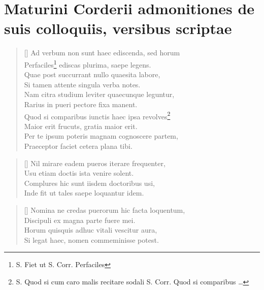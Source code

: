 \documentclass{article}
\begin{document}
\section*{Maturini Corderii admonitiones de suis colloquiis, versibus scriptae}


\settowidth{\versewidth}{Nam citra studium leviter quaecunque leguntur,}
\begin{verse}[\versewidth]
Ad verbum non sunt haec ediscenda, sed horum\\
Perfaciles\footnote{S. Fiet ut S. Corr. Perfaciles} ediscas plurima, saepe legens.\\
Quae post succurrant nullo quaesita labore,\\
Si tamen attente singula verba notes.\\
Nam citra studium leviter quaecunque leguntur,\\
Rarius in pueri pectore fixa manent.\\
Quod si comparibus iunctis haec ipsa revolves\footnote{S. Quod si cum caro malis recitare sodali S. Corr. Quod si comparibus \ldots}\\
Maior erit frucuts, gratia maior erit.\\
Per te ipsum poteris magnam cognoscere partem,\\
Praeceptor faciet cetera plana tibi.\\
\end{verse}


\settowidth{\versewidth}{Nil mirare eadem pueros iterare frequenter,}
\begin{verse}[\versewidth]
Nil mirare eadem pueros iterare frequenter,\\
Usu etiam doctis ista venire solent.\\
Complures hic sunt iisdem doctoribus usi,\\
Inde fit ut tales saepe loquantur idem.\\
\end{verse}

\settowidth{\versewidth}{Horum quisquis adhuc vitali vescitur aura,}
\begin{verse}[\versewidth]
Nomina ne credas puerorum hic facta loquentum,\\
Discipuli ex magna parte fuere mei.\\
Horum quisquis adhuc vitali vescitur aura,\\
Si legat haec, nomen commeminisse potest.\\
\end{verse}
\end{document}
